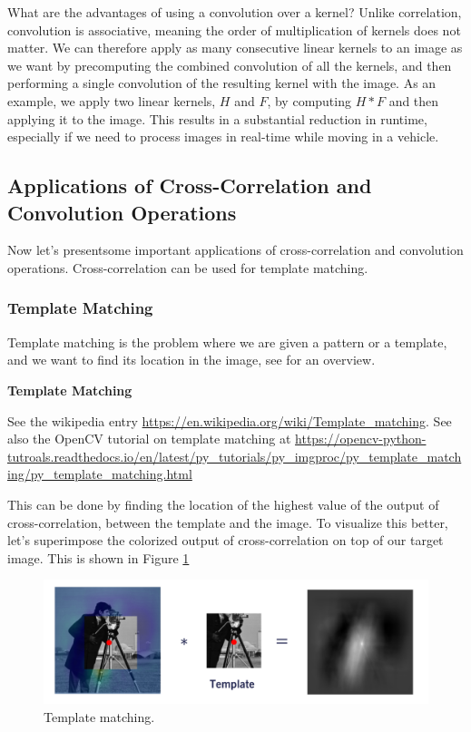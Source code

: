 What are the advantages of using a convolution over a kernel? Unlike correlation,
convolution is associative, meaning the order of multiplication of
kernels does not matter. We can therefore apply as many consecutive linear kernels
to an image as we want by precomputing
the combined convolution of all the kernels, and then performing
a single convolution of the resulting kernel with the image. As an example, we apply
two linear kernels, $H$ and $F$, by computing $H*F$ and then
applying it to the image. This results in a substantial
reduction in runtime, especially if we need to process images in real-time while
moving in a vehicle. 


\subsection{Applications of Cross-Correlation and Convolution Operations}

Now let's presentsome important applications of cross-correlation and convolution operations. Cross-correlation can be
used for template matching. 

\subsubsection{Template Matching}

Template matching is the problem where we are given a pattern
or a template, and we want to find its location in the image, see \cite{Nazil2013} for an overview. 

\begin{framed}
\begin{remark}{\textbf{Template Matching}}

See the wikipedia entry \url{https://en.wikipedia.org/wiki/Template_matching}. 
See also the OpenCV tutorial on template matching at \url{https://opencv-python-tutroals.readthedocs.io/en/latest/py_tutorials/py_imgproc/py_template_matching/py_template_matching.html}
\end{remark}
\end{framed}

This can be done by finding the location of the highest value of the output
of cross-correlation, between the template and the image. To visualize this better, let's superimpose
the colorized output of cross-correlation on top of our target image. This is shown in Figure \ref{camera_man_5}


\begin{figure}[!htb]
\begin{center}
\includegraphics[scale=0.380]{img/visual_perception/camera_man_5.jpeg}
\end{center}
\caption{Template matching.}
\label{camera_man_5}
\end{figure} 



